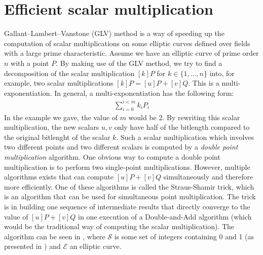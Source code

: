 \section{Efficient scalar multiplication}
Gallant--Lambert--Vanstone (GLV) method is a way of speeding up the computation of scalar multiplications on some elliptic curves defined over fields with a large prime characteristic.
Assume we have an elliptic curve of prime order $n$ with a point $P$.
By making use of the GLV method, we try to find a decomposition of the scalar multiplication $[k]P$ for $k \in \{1, \ldots, n\}$ into, for example, two scalar multiplications $[k]P = [u]P + [v]Q$.
This is a multi-exponentiation.
In general, a multi-exponentiation has the following form:
%
\begin{align*}
\sum_{i = 0}^{i < m} k_i P_i
\end{align*}
%
In the example we gave, the value of $m$ would be 2.
By rewriting this scalar multiplication, the new scalars $u, v$ only have half of the bitlength compared to the original bitlenght of the scalar $k$.
Such a scalar multiplication which involves two different points and two different scalars is computed by a \emph{double point multiplication} algorithm.
One obvious way to compute a double point multiplication is to perform two single-point multiplications. However, multiple algorithms exists that can compute $[u]P + [v]Q$ simultaneously and therefore more efficiently.
One of these algorithms is called the Straus-Shamir trick, which is an algorithm that can be used for simultaneous point multiplication.
The trick is in building one sequence of intermediate results that directly converge to the value of $[u]P + [v]Q$ in one execution of a Double-and-Add algorithm (which would be the traditional way of computing the scalar multiplication).
The algorithm can be seen in  , where $\mathcal{S}$ is some set of integers containing 0 and 1 (as presented in \cite{moller2002improved}) and $\mathcal{E}$ an elliptic curve.
%
